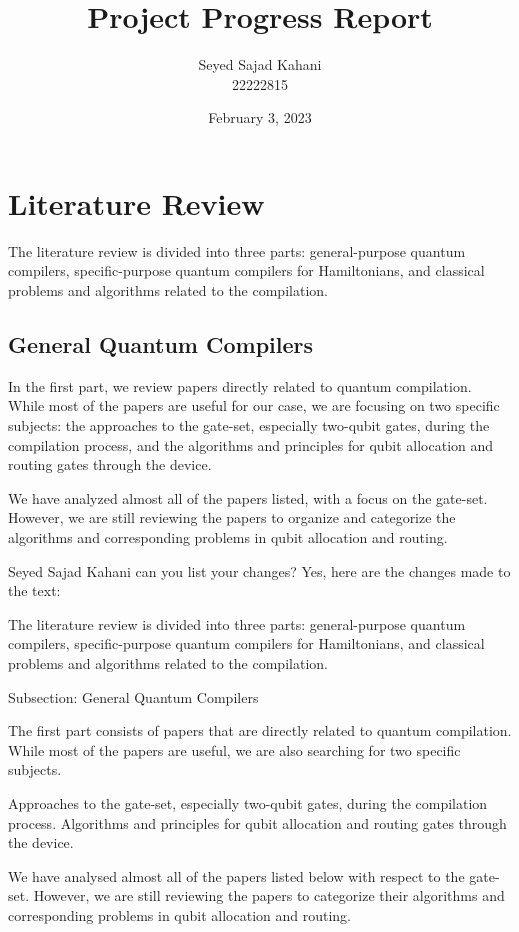 \documentclass{article}
\title{Project Progress Report}
\author{Seyed Sajad Kahani \\ 22222815}
\date{February 3, 2023}
\begin{document}
\maketitle

\nocite{*}

\section{Literature Review}

The literature review is divided into three parts: general-purpose quantum compilers, specific-purpose quantum compilers for Hamiltonians, and classical problems and algorithms related to the compilation.

\subsection{General Quantum Compilers}

In the first part, we review papers directly related to quantum compilation. While most of the papers are useful for our case, we are focusing on two specific subjects: the approaches to the gate-set, especially two-qubit gates, during the compilation process, and the algorithms and principles for qubit allocation and routing gates through the device.

We have analyzed almost all of the papers listed, with a focus on the gate-set. However, we are still reviewing the papers to organize and categorize the algorithms and corresponding problems in qubit allocation and routing.




Seyed Sajad Kahani
can you list your changes?
Yes, here are the changes made to the text:

The literature review is divided into three parts: general-purpose quantum compilers, specific-purpose quantum compilers for Hamiltonians, and classical problems and algorithms related to the compilation.

Subsection: General Quantum Compilers

The first part consists of papers that are directly related to quantum compilation. While most of the papers are useful, we are also searching for two specific subjects.

Approaches to the gate-set, especially two-qubit gates, during the compilation process.
Algorithms and principles for qubit allocation and routing gates through the device.

We have analysed almost all of the papers listed below with respect to the gate-set. However, we are still reviewing the papers to categorize their algorithms and corresponding problems in qubit allocation and routing.
\end{document}
